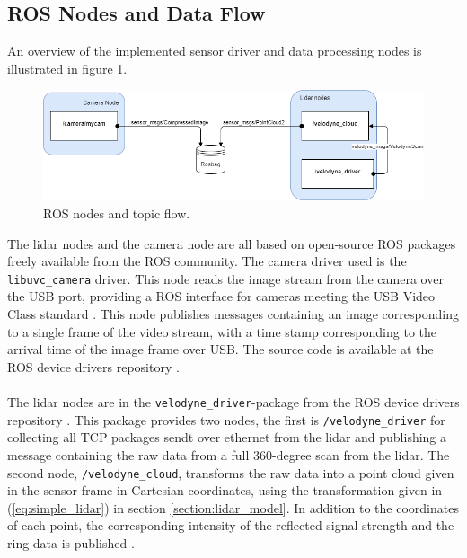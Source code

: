 \subsection{ROS Nodes and Data Flow}
An overview of the implemented sensor driver and data processing nodes is illustrated in figure \ref{fig:ros_nodes}.
\begin{figure}
    \centering
    \includegraphics[width=\linewidth]{fig/ros.png}
    \caption{ROS nodes and topic flow.}
    \label{fig:ros_nodes}
\end{figure}
The lidar nodes and the camera node are all based on open-source ROS packages freely available from the ROS community. The camera driver used is the \\\lstinline[basicstyle=\ttfamily]{libuvc_camera} driver. This node reads the image stream from the camera over the USB port, providing a ROS interface for cameras meeting the USB Video Class standard \cite{libuvc_camera}. This node publishes messages containing an image corresponding to a single frame of the video stream, with a time stamp corresponding to the arrival time of the image frame over USB. The source code is available at the ROS device drivers repository \cite{ros_drivers}.\\
\vspace{2mm}\\
\noindent The lidar nodes are in the \lstinline[basicstyle=\ttfamily]{velodyne_driver}-package from the ROS device drivers repository \cite{ros_drivers}. This package provides two nodes, the first is \lstinline[basicstyle=\ttfamily]{/velodyne_driver} for collecting all TCP packages sendt over ethernet from the lidar and publishing a message containing the raw data from a full 360-degree scan from the lidar. The second node, \lstinline[basicstyle=\ttfamily]{/velodyne_cloud}, transforms the raw data into a point cloud given in the sensor frame in Cartesian coordinates, using the transformation given in (\ref{eq:simple_lidar}) in section \ref{section:lidar_model}. In addition to the coordinates of each point, the corresponding intensity of the reflected signal strength and the ring data is published \cite{velodyne_driver}.\\ 
